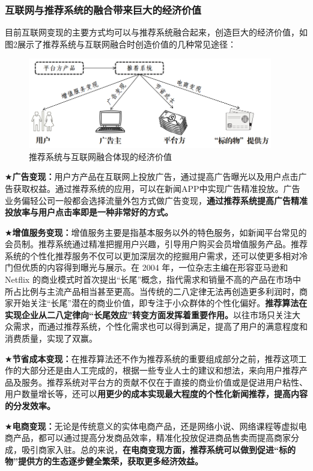 \documentclass[withoutpreface,bwprint]{cumcmthesis} %
\begin{document}
	\subsubsection{ 互联网与推荐系统的融合带来巨大的经济价值}
	目前互联网变现的主要方式均可以与推荐系统融合起来，创造巨大的经济价值，如图2展示了推荐系统与互联网融合时创造价值的几种常见途径：
	\begin{figure}[H]
		\centering
		\includegraphics[width=0.95\textwidth]{1}
		\caption{推荐系统与互联网融合体现的经济价值}
		\label{fig:circuit-diagcam}
	\end{figure}
	$\bigstar$\textbf{广告变现：}用户方产品在互联网上投放广告，通过提高广告曝光以及用户点击广告获取权益。通过推荐系统的应用，可以在新闻APP中实现广告精准投放。广告业务偏轻公司一般都会选择流量外包方式做广告变现，\textbf{通过推荐系统提高广告精准投放率与用户点击率即是一种非常好的方式。}\par
	$\bigstar$\textbf{增值服务变现：}增值服务主要是指基本服务以外的特色服务，如新闻平台常见的会员制。推荐系统通过精准把握用户兴趣，引导用户购买会员增值服务产品。推荐系统的个性化推荐服务不仅可以更加深层次的挖掘用户需求，还可以使更多相对冷门但优质的内容得到曝光与展示。在 2004 年，一位杂志主编在形容亚马逊和 Netflix 的商业模式时首次提出“长尾”概念，指代需求和销量不高的产品在市场中所占比例与主流产品相当甚至更高。当传统的二八定律无法再创造更多利润时，商家开始关注“长尾”潜在的商业价值，即专注于小众群体的个性化偏好。\textbf{推荐算法在实现企业从二八定律向“长尾效应”转变方面发挥着重要作用。}以往市场只关注大众需求，而通过推荐系统，个性化需求也可以得到满足，提高了用户的满意程度和消费质量，实现了双赢。\par
	$\bigstar$\textbf{节省成本变现：}在推荐算法还不作为推荐系统的重要组成部分之前，推荐这项工作的大部分还是由人工完成的，根据一些专业人士的建议和想法，来向用户推荐产品及服务。推荐系统对平台方的贡献不仅在于直接的商业价值或是促进用户粘性、用户数量增长等，还可以\textbf{用更少的成本实现最大程度的个性化新闻推荐，提高内容的分发效率。}\par
	$\bigstar$\textbf{电商变现：}无论是传统意义的实体电商产品，还是网络小说、网络课程等虚拟电商产品，都可以通过提高分发商品效率，精准化投放促进商品售卖而提高商家分成，吸引商家入驻。总的来说，\textbf{在电商变现方面，推荐系统可以做到促进“标的物”提供方的生态逐步健全繁荣，获取更多经济效益。}\par
\end{document}
